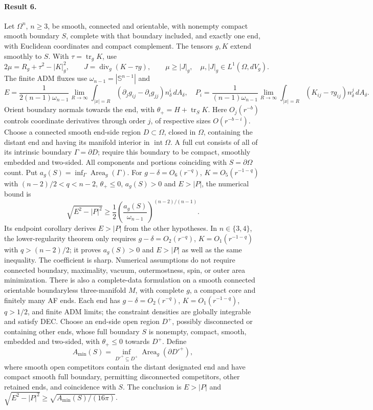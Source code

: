 \documentclass[11pt]{article}
\begin{document}
\paragraph{Result 6.} Let $\Omega^n$, $n\ge3$, be smooth, connected and orientable, with nonempty compact smooth boundary $S$, complete with that boundary included, and exactly one end, with Euclidean coordinates and compact complement. The tensors $g,K$ extend smoothly to $S$. With $\tau=\operatorname{tr}_gK$, use
\[
 2\mu=R_g+\tau^2-|K|_g^2,\qquad J=\operatorname{div}_g(K-\tau g),\qquad
 \mu\ge|J|_g,\quad\mu,|J|_g\in L^1(\Omega,dV_g).
\]
The finite ADM fluxes use $\omega_{n-1}=|\mathbb S^{n-1}|$ and
\[
 E=\frac1{2(n-1)\omega_{n-1}}\lim_{R\to\infty}\int_{|x|=R}
 (\partial_jg_{ij}-\partial_ig_{jj})n_\delta^i\,dA_\delta,\quad
 P_i=\frac1{(n-1)\omega_{n-1}}\lim_{R\to\infty}\int_{|x|=R}(K_{ij}-\tau g_{ij})n_\delta^j\,dA_\delta.
\]
Orient boundary normals towards the end, with $\theta_+=H+\operatorname{tr}_SK$. Here $O_j(r^{-b})$ controls coordinate derivatives through order $j$, of respective sizes $O(r^{-b-i})$. Choose a connected smooth end-side region $D\subset\Omega$, closed in $\Omega$, containing the distant end and having its manifold interior in $\operatorname{int}\Omega$. A full cut consists of all of its intrinsic boundary $\Gamma=\partial D$; require this boundary to be compact, smoothly embedded and two-sided. All components and portions coinciding with $S=\partial\Omega$ count. Put $a_g(S)=\inf_\Gamma\operatorname{Area}_g(\Gamma)$. For $g-\delta=O_6(r^{-q})$, $K=O_5(r^{-1-q})$ with $(n-2)/2<q<n-2$, $\theta_+\le0$, $a_g(S)>0$ and $E>|P|$, the numerical bound is
\[
 \sqrt{E^2-|P|^2}\ge\frac12\left(\frac{a_g(S)}{\omega_{n-1}}\right)^{(n-2)/(n-1)}.
\]
Its endpoint corollary derives $E>|P|$ from the other hypotheses. In $n\in\{3,4\}$, the lower-regularity theorem only requires $g-\delta=O_2(r^{-q})$, $K=O_1(r^{-1-q})$ with $q>(n-2)/2$; it proves $a_g(S)>0$ and $E>|P|$ as well as the same inequality. The coefficient is sharp. Numerical assumptions do not require connected boundary, maximality, vacuum, outermostness, spin, or outer area minimization. There is also a complete-data formulation on a smooth connected orientable boundaryless three-manifold $M$, with complete $g$, a compact core and finitely many AF ends. Each end has $g-\delta=O_2(r^{-q})$, $K=O_1(r^{-1-q})$, $q>1/2$, and finite ADM limits; the constraint densities are globally integrable and satisfy DEC. Choose an end-side open region $D^+$, possibly disconnected or containing other ends, whose full boundary $S$ is nonempty, compact, smooth, embedded and two-sided, with $\theta_+\le0$ towards $D^+$. Define
\[
 A_{\min}(S)=\inf_{D'^+\subseteq D^+}\operatorname{Area}_g(\partial D'^+),
\]
where smooth open competitors contain the distant designated end and have compact smooth full boundary, permitting disconnected competitors, other retained ends, and coincidence with $S$. The conclusion is $E>|P|$ and $\sqrt{E^2-|P|^2}\ge\sqrt{A_{\min}(S)/(16\pi)}$.
\end{document}

